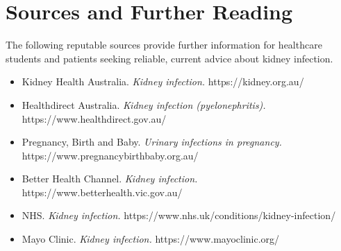 \section*{Sources and Further Reading}
The following reputable sources provide further information for healthcare students and patients seeking reliable, current advice about kidney infection.
\begin{itemize}
    \item Kidney Health Australia. \textit{Kidney infection.} https://kidney.org.au/
    \item Healthdirect Australia. \textit{Kidney infection (pyelonephritis).} https://www.healthdirect.gov.au/
    \item Pregnancy, Birth and Baby. \textit{Urinary infections in pregnancy.} https://www.pregnancybirthbaby.org.au/
    \item Better Health Channel. \textit{Kidney infection.} https://www.betterhealth.vic.gov.au/
    \item NHS. \textit{Kidney infection.} https://www.nhs.uk/conditions/kidney-infection/
    \item Mayo Clinic. \textit{Kidney infection.} https://www.mayoclinic.org/
\end{itemize}
